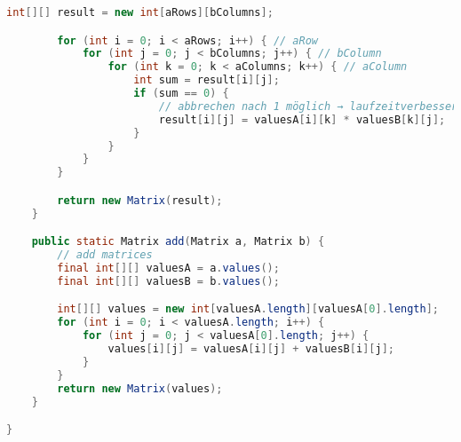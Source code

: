 \begin{lstlisting}[language=Java,label={lst:sourcecode}]
        int[][] result = new int[aRows][bColumns];

        for (int i = 0; i < aRows; i++) { // aRow
            for (int j = 0; j < bColumns; j++) { // bColumn
                for (int k = 0; k < aColumns; k++) { // aColumn
                    int sum = result[i][j];
                    if (sum == 0) {
                        // abbrechen nach 1 möglich → laufzeitverbesserung
                        result[i][j] = valuesA[i][k] * valuesB[k][j];
                    }
                }
            }
        }

        return new Matrix(result);
    }

    public static Matrix add(Matrix a, Matrix b) {
        // add matrices
        final int[][] valuesA = a.values();
        final int[][] valuesB = b.values();

        int[][] values = new int[valuesA.length][valuesA[0].length];
        for (int i = 0; i < valuesA.length; i++) {
            for (int j = 0; j < valuesA[0].length; j++) {
                values[i][j] = valuesA[i][j] + valuesB[i][j];
            }
        }
        return new Matrix(values);
    }

}
\end{lstlisting}
